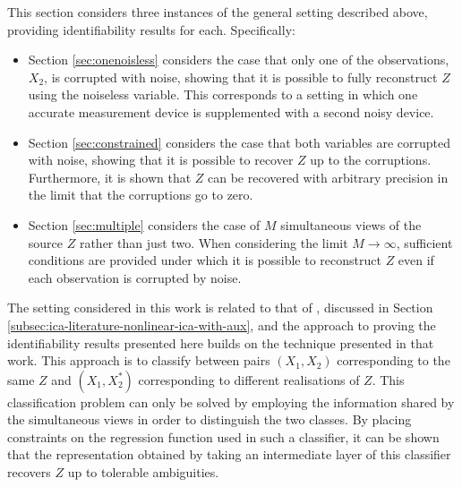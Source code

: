 This section considers three instances of the general setting described above, providing identifiability results for each.
Specifically:
%
\begin{itemize}
	\item Section \ref{sec:onenoisless} considers the case that only one of the observations, $X_2$, is corrupted with noise, showing that it is possible to fully reconstruct $Z$ using the noiseless variable. 
	This corresponds to a setting in which one accurate measurement device is supplemented with a second noisy device. 
	\item Section \ref{sec:constrained} considers the case that both variables are corrupted with noise, showing that it is possible to recover $Z$ up to the corruptions. 
	Furthermore, it is shown that $Z$ can be recovered with arbitrary precision in the limit that the corruptions go to zero.
	\item Section \ref{sec:multiple} considers the case of $M$ simultaneous views of the source $Z$ rather than just two.
	When considering the limit $M \rightarrow \infty$, sufficient conditions are provided under which it is possible to reconstruct $Z$ even if each observation is corrupted by noise.
\end{itemize}
%



The setting considered in this work is related to that of \cite{hyvarinen19a}, discussed in Section \ref{subsec:ica-literature-nonlinear-ica-with-aux},
and the approach to proving the identifiability results presented here builds on the technique presented in that work.
This approach 
is to classify between pairs $(X_1, X_2)$ corresponding to the same $Z$ and $(X_1, X^*_2)$ corresponding to different realisations of $Z$.
This classification problem can only be solved by employing the information shared by the simultaneous views in order to distinguish the two classes.
By placing constraints on the regression function used in such a classifier, it can be shown that the representation obtained by taking an intermediate layer of this classifier recovers $Z$ up to tolerable ambiguities.

